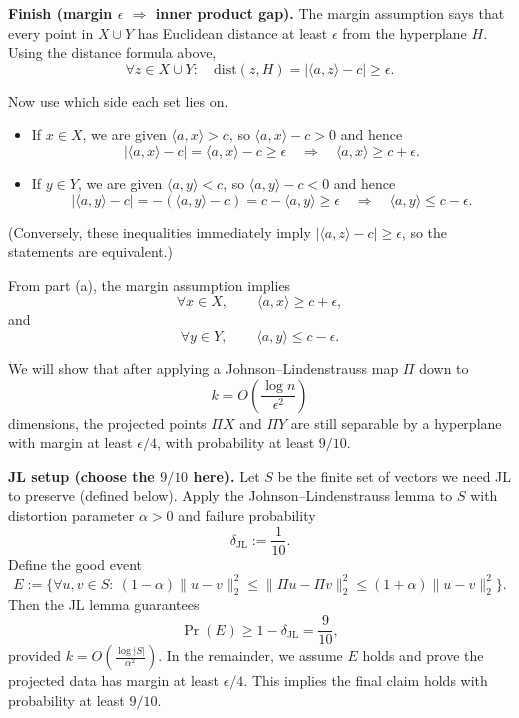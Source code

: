 \documentclass[10pt]{article}
\newcommand{\spara}[1]{\vspace{.5em}\noindent {\large\sffamily\textcolor{nyuOfficialPurple}{#1}}}
\begin{document}
\medskip
\textbf{Finish (margin $\epsilon$ $\Rightarrow$ inner product gap).}
The margin assumption says that every point in $X\cup Y$ has Euclidean distance at least $\epsilon$ from the hyperplane $H$. Using the distance formula above,
\[
\forall z\in X\cup Y:\quad \mathrm{dist}(z,H)=|\langle a,z\rangle-c|\ge \epsilon.
\]

Now use which side each set lies on.

\begin{itemize}
\item If $x\in X$, we are given $\langle a,x\rangle>c$, so $\langle a,x\rangle-c>0$ and hence
\[
|\langle a,x\rangle-c|=\langle a,x\rangle-c\ge \epsilon
\quad\Longrightarrow\quad
\boxed{\langle a,x\rangle \ge c+\epsilon.}
\]

\item If $y\in Y$, we are given $\langle a,y\rangle<c$, so $\langle a,y\rangle-c<0$ and hence
\[
|\langle a,y\rangle-c|=-(\langle a,y\rangle-c)=c-\langle a,y\rangle\ge \epsilon
\quad\Longrightarrow\quad
\boxed{\langle a,y\rangle \le c-\epsilon.}
\]
\end{itemize}

(Conversely, these inequalities immediately imply $|\langle a,z\rangle-c|\ge \epsilon$, so the statements are equivalent.)

\spara{Pr. 1(b) Johnson--Lindenstrauss preserves separability up to constant-factor margin loss}

From part (a), the margin assumption implies
\[
\forall x\in X,\qquad \langle a,x\rangle \ge c+\epsilon,
\]
and
\[
\forall y\in Y,\qquad \langle a,y\rangle \le c-\epsilon.
\]

We will show that after applying a Johnson--Lindenstrauss map $\Pi$ down to
\[
k = O\!\left(\frac{\log n}{\epsilon^2}\right)
\]
dimensions, the projected points $\Pi X$ and $\Pi Y$ are still separable by a hyperplane with margin at least $\epsilon/4$, with probability at least $9/10$.

\medskip
\textbf{JL setup (choose the $9/10$ here).}
Let $S$ be the finite set of vectors we need JL to preserve (defined below).
Apply the Johnson--Lindenstrauss lemma to $S$ with distortion parameter $\alpha>0$
and failure probability
\[
\delta_{\mathrm{JL}} := \frac{1}{10}.
\]
Define the good event
\[
E := \Big\{\forall u,v\in S:\ (1-\alpha)\|u-v\|_2^2 \le \|\Pi u-\Pi v\|_2^2 \le (1+\alpha)\|u-v\|_2^2\Big\}.
\]
Then the JL lemma guarantees
\[
\Pr(E) \ge 1-\delta_{\mathrm{JL}} = \frac{9}{10},
\]
provided $k = O\!\left(\frac{\log |S|}{\alpha^2}\right)$.
In the remainder, we assume $E$ holds and prove the projected data has margin at least $\epsilon/4$.
This implies the final claim holds with probability at least $9/10$.
\end{document}
